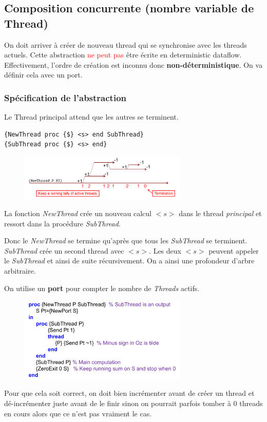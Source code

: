\documentclass{report}
\begin{document}
\subsection{Composition concurrente (nombre variable de Thread)}
On doit arriver à créer de nouveau thread qui se synchronise avec les threads actuels. Cette abstraction \textcolor{red}{ne peut pas} être écrite en deterministic dataflow. Effectivement, l'ordre de création est inconnu donc \textbf{non-déterministique}. On va définir cela avec un port.

\subsubsection{Spécification de l'abstraction}
Le Thread principal attend que les autres se terminent. 
\begin{lstlisting}[escapechar=\%]
{NewThread proc {$} <s> end SubThread} 
{SubThread proc {$} <s> end}
\end{lstlisting}
\begin{figure}
\centering
\includegraphics[width=8cm]{img/newThread.png}
\end{figure}
La fonction \textit{NewThread} crée un nouveau calcul $<s>$ dans le thread \textit{principal} et ressort dans la procédure \textit{SubThread}.\par 
Donc le \textit{NewThread} se termine qu'après que tous les \textit{SubThread} se terminent. \textit{SubThread} crée un second thread avec $<s>$. Les deux $<s>$ peuvent appeler le \textit{SubThread} et ainsi de suite récursivement. On a ainsi une profondeur d'arbre arbitraire.\par 
On utilise un \textbf{port} pour compter le nombre de \textit{Threads} actifs. 
\begin{figure}[H]
\centering
\includegraphics[width=8cm]{img/newThreadImplementation.png}
\end{figure} 
Pour que cela soit correct, on doit bien incrémenter avant de créer un thread et dé-incrémenter juste avant de le finir sinon on pourrait parfois tomber à 0 threads en cours alors que ce n'est pas vraiment le cas.
\end{document}
